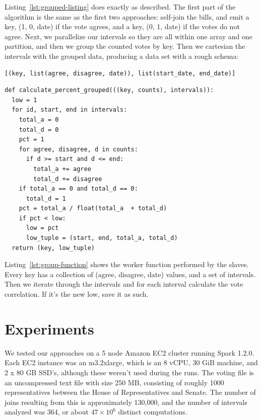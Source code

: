 \documentclass[11pt]{article}
\begin{document}
Listing~\ref{lst:grouped-listing} does exactly as described. The first part of the algorithm is the same as the first two approaches: self-join the bills, and emit a key, (1, 0, date) if the vote agrees, and a key, (0, 1, date) if the votes do not agree. Next, we parallelize our intervals so they are all within one array and one partition, and then we group the counted votes by key. Then we cartesian the intervals with the grouped data, producing a data set with a rough schema:

\begin{lstlisting}[caption={Schema of grouped function}, label={lst:schema}]
[(key, list(agree, disagree, date)), list(start_date, end_date)]
\end{lstlisting}

\begin{lstlisting}[caption={Grouped percent function}, label={lst:group-function}]
def calculate_percent_grouped(((key, counts), intervals)):
  low = 1
  for id, start, end in intervals:
    total_a = 0
    total_d = 0
    pct = 1
    for agree, disagree, d in counts:
      if d >= start and d <= end:
        total_a += agree
        total_d += disagree
    if total_a == 0 and total_d == 0:
      total_d = 1
    pct = total_a / float(total_a  + total_d)
    if pct < low:
      low = pct
      low_tuple = (start, end, total_a, total_d)
  return (key, low_tuple)
\end{lstlisting}

Listing~\ref{lst:group-function} shows the worker function performed by the slaves. Every key has a collection of (agree, disagree, date) values, and a set of intervals. Then we iterate through the intervals and for each interval calculate the vote correlation. If it's the new low, save it as such.

\section{Experiments}
We tested our approaches on a 5 node Amazon EC2 cluster running Spark 1.2.0. Each EC2 instance was an m3.2xlarge, which is an 8 vCPU, 30 GiB machine, and 2 x 80 GB SSD's, although these weren't used during the runs. The voting file is an uncompressed text file with size 250 MB, consisting of roughly 1000 representatives between the House of Representatives and Senate. The number of joins resulting from this is approximately 130,000, and the number of intervals analyzed was 364, or about $47 \times 10^6$ distinct computations.
\end{document}
